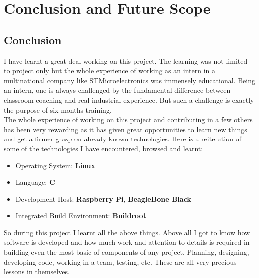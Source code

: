 \chapter{Conclusion and Future Scope}
\section{Conclusion}
I have learnt a great deal working on this project. The learning was not limited to project only but the whole experience of working as an intern in a multinational company like STMicroelectronics was immensely educational. Being an intern, one is always challenged by the fundamental difference between classroom coaching and real industrial experience. But such a challenge is exactly the purpose of six months training.\\
The whole experience of working on this project and contributing in a few others has been very rewarding as it has given great opportunities to learn new things and get a firmer grasp on already known technologies. Here is a reiteration of some of the technologies I have encountered, browsed and learnt:\\
\begin{itemize}
	\item Operating System: \textbf{Linux}
	\item Language: \textbf{C}
	\item Development Host: \textbf{Raspberry Pi}, \textbf{BeagleBone Black}
	\item Integrated Build Environment: \textbf{Buildroot}
\end{itemize}
So during this project I learnt all the above things. Above all I got to know how software is developed and how much work and attention to details is required in building even the most basic of components of any project. Planning, designing, developing code, working in a team, testing, etc. These are all very precious lessons in themselves. 
